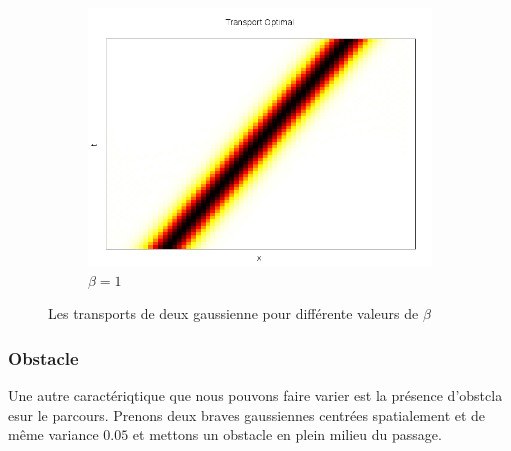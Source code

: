 \documentclass[a4paper,12pt]{article}
\begin{document}
\begin{figure}[!h]
	\begin{subfigure}[b]{0.48\linewidth}
	\includegraphics[width=\textwidth]{img/1DGeneralise/transport100.png}
	\caption{$\beta = 1$}
	\end{subfigure}	
	\caption{Les transports de deux gaussienne pour différente valeurs de $\beta$}
\end{figure}

\newpage
\subsubsection{Obstacle}

Une autre caractériqtique que nous pouvons faire varier est la présence d'obstcla esur le parcours. Prenons deux braves gaussiennes centrées spatialement et de même variance $0.05$ et mettons un obstacle en plein milieu du passage. 
\end{document}
